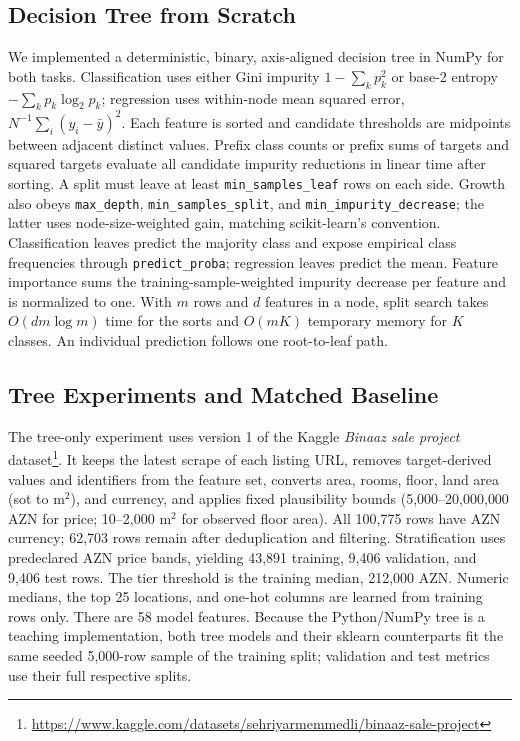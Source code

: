 \subsection{Decision Tree from Scratch}
We implemented a deterministic, binary, axis-aligned decision tree in NumPy for both tasks. Classification uses either Gini impurity $1-\sum_k p_k^2$ or base-2 entropy $-\sum_k p_k\log_2 p_k$; regression uses within-node mean squared error, $N^{-1}\sum_i(y_i-\bar y)^2$. Each feature is sorted and candidate thresholds are midpoints between adjacent distinct values. Prefix class counts or prefix sums of targets and squared targets evaluate all candidate impurity reductions in linear time after sorting. A split must leave at least \texttt{min\_samples\_leaf} rows on each side. Growth also obeys \texttt{max\_depth}, \texttt{min\_samples\_split}, and \texttt{min\_impurity\_decrease}; the latter uses node-size-weighted gain, matching scikit-learn's convention. Classification leaves predict the majority class and expose empirical class frequencies through \texttt{predict\_proba}; regression leaves predict the mean. Feature importance sums the training-sample-weighted impurity decrease per feature and is normalized to one. With $m$ rows and $d$ features in a node, split search takes $O(dm\log m)$ time for the sorts and $O(mK)$ temporary memory for $K$ classes. An individual prediction follows one root-to-leaf path.

\subsection{Tree Experiments and Matched Baseline}
The tree-only experiment uses version 1 of the Kaggle \emph{Binaaz sale project} dataset\footnote{\url{https://www.kaggle.com/datasets/sehriyarmemmedli/binaaz-sale-project}}. It keeps the latest scrape of each listing URL, removes target-derived values and identifiers from the feature set, converts area, rooms, floor, land area (sot to $\mathrm{m}^2$), and currency, and applies fixed plausibility bounds (5{,}000--20{,}000{,}000 AZN for price; 10--2{,}000 $\mathrm{m}^2$ for observed floor area). All 100{,}775 rows have AZN currency; 62{,}703 rows remain after deduplication and filtering. Stratification uses predeclared AZN price bands, yielding 43{,}891 training, 9{,}406 validation, and 9{,}406 test rows. The tier threshold is the training median, 212{,}000 AZN. Numeric medians, the top 25 locations, and one-hot columns are learned from training rows only. There are 58 model features. Because the Python/NumPy tree is a teaching implementation, both tree models and their sklearn counterparts fit the same seeded 5{,}000-row sample of the training split; validation and test metrics use their full respective splits.

